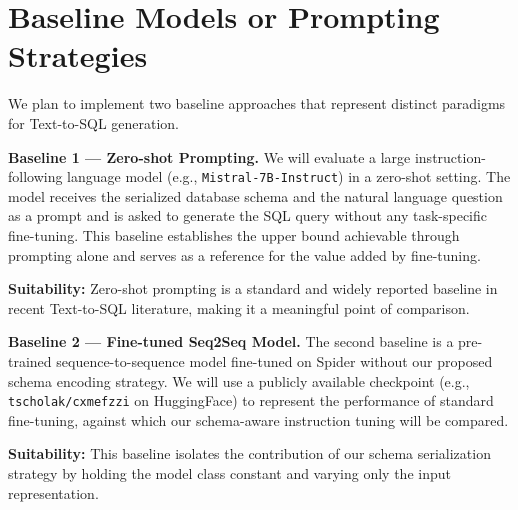 \documentclass[11pt,a4paper]{article}
\begin{document}
\section{Baseline Models or Prompting Strategies}


We plan to implement two baseline approaches that represent distinct
paradigms for Text-to-SQL generation.

\noindent\textbf{Baseline 1 — Zero-shot Prompting.}
We will evaluate a large instruction-following language model
(e.g., \texttt{Mistral-7B-Instruct}) in a zero-shot setting.
The model receives the serialized database schema and the natural language
question as a prompt and is asked to generate the SQL query without any
task-specific fine-tuning.
This baseline establishes the upper bound achievable through prompting alone
and serves as a reference for the value added by fine-tuning.

\noindent\textbf{Suitability:} Zero-shot prompting is a standard and widely
reported baseline in recent Text-to-SQL literature, making it a meaningful
point of comparison.

\noindent\textbf{Baseline 2 — Fine-tuned Seq2Seq Model.}
The second baseline is a pre-trained sequence-to-sequence model
fine-tuned on Spider without our proposed schema encoding strategy.
We will use a publicly available checkpoint (e.g., \texttt{tscholak/cxmefzzi}
on HuggingFace) to represent the performance of standard fine-tuning,
against which our schema-aware instruction tuning will be compared.

\noindent\textbf{Suitability:} This baseline isolates the contribution of
our schema serialization strategy by holding the model class constant and
varying only the input representation.
\end{document}
